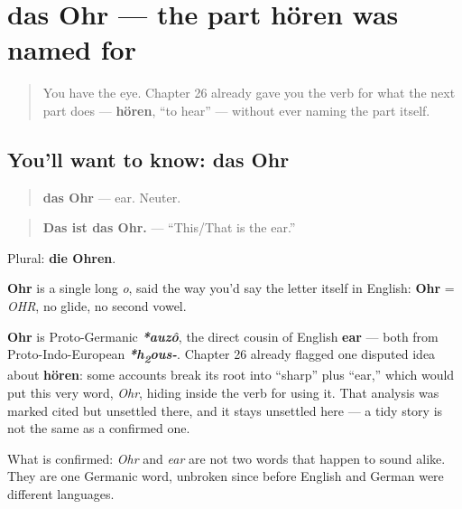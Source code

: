 \section[das Ohr]{das Ohr — the part hören was named for}

\label{lesson:GE-C30-ohr}



\begin{quote}
You have the eye. Chapter 26 already gave you the verb for what the next part does — \textbf{hören}, \textquotedblleft{}to hear\textquotedblright{} — without ever naming the part itself.
\end{quote}

\subsection*{You'll want to know: das Ohr}
\begin{quote}
\textbf{das Ohr} — ear. Neuter.
\end{quote}

\begin{quote}
\textbf{Das ist das Ohr.} — \textquotedblleft{}This/That is the ear.\textquotedblright{}
\end{quote}

Plural: \textbf{die Ohren}.

\begin{sounds}
\textbf{Ohr} is a single long \emph{o}, said the way you'd say the letter itself in English: \textbf{Ohr} = \emph{OHR}, no glide, no second vowel.
\end{sounds}

\begin{cousinweb}
\textbf{Ohr} is Proto-Germanic \emph{\textbf{*auzô}}, the direct cousin of English \textbf{ear} — both from Proto-Indo-European \emph{\textbf{*h\textsubscript{2}ous-}}. Chapter 26 already flagged one disputed idea about \textbf{hören}: some accounts break its root into \textquotedblleft{}sharp\textquotedblright{} plus \textquotedblleft{}ear,\textquotedblright{} which would put this very word, \emph{Ohr}, hiding inside the verb for using it. That analysis was marked cited but unsettled there, and it stays unsettled here — a tidy story is not the same as a confirmed one.

What is confirmed: \emph{Ohr} and \emph{ear} are not two words that happen to sound alike. They are one Germanic word, unbroken since before English and German were different languages.
\end{cousinweb}

